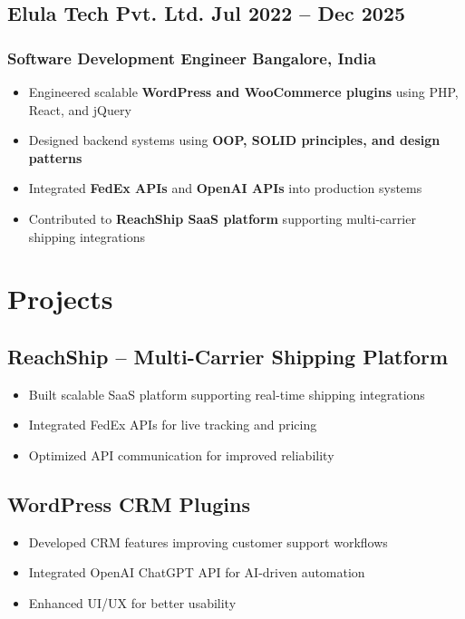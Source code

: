 \documentclass[11pt]{article}
\begin{document}
\subsection{Elula Tech Pvt. Ltd. \hfill Jul 2022 -- Dec 2025}
\subsubsection{Software Development Engineer \hfill Bangalore, India}
\begin{itemize}
\item Engineered scalable \textbf{WordPress and WooCommerce plugins} using PHP, React, and jQuery
\item Designed backend systems using \textbf{OOP, SOLID principles, and design patterns}
\item Integrated \textbf{FedEx APIs} and \textbf{OpenAI APIs} into production systems
\item Contributed to \textbf{ReachShip SaaS platform} supporting multi-carrier shipping integrations
\end{itemize}

\section{Projects}

\subsection{ReachShip – Multi-Carrier Shipping Platform}
\begin{itemize}
\item Built scalable SaaS platform supporting real-time shipping integrations
\item Integrated FedEx APIs for live tracking and pricing
\item Optimized API communication for improved reliability
\end{itemize}

\subsection{WordPress CRM Plugins}
\begin{itemize}
\item Developed CRM features improving customer support workflows
\item Integrated OpenAI ChatGPT API for AI-driven automation
\item Enhanced UI/UX for better usability
\end{itemize}
\end{document}
